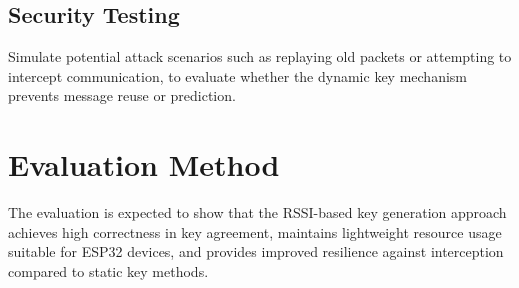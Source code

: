 \subsection{Security Testing}
Simulate potential attack scenarios such as replaying old packets or attempting to intercept communication, to evaluate whether the dynamic key mechanism prevents message reuse or prediction.

 \section{Evaluation Method}
 The evaluation is expected to show that the RSSI-based key generation approach achieves high correctness in key agreement, maintains lightweight resource usage suitable for ESP32 devices, and provides improved resilience against interception compared to static key methods.